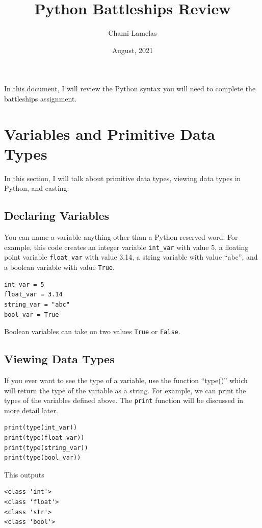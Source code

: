 \documentclass{article}
\title{Python Battleships Review
}
\author{Chami Lamelas}
\date{August, 2021}
\begin{document}
\maketitle
\noindent In this document, I will review the Python syntax you will need to complete the battleships assignment. 

\section{Variables and Primitive Data Types}
In this section, I will talk about primitive data types, viewing data types in Python, and casting.

\subsection{Declaring Variables}
You can name a variable anything other than a Python reserved word. For example, this code creates an integer variable \texttt{int\_var} with value 5, a floating point variable \texttt{float\_var} with value 3.14, a string variable with value ``abc'', and a boolean variable with value \texttt{True}.
\begin{verbatim}
int_var = 5
float_var = 3.14
string_var = "abc"
bool_var = True
\end{verbatim}
Boolean variables can take on two values \texttt{True} or \texttt{\texttt{False}}.

\subsection{Viewing Data Types}
If you ever want to see the type of a variable, use the function ``type()'' which will return the type of the variable as a string. For example, we can print the types of the variables defined above. The \texttt{print} function will be discussed in more detail later.
\begin{verbatim}
print(type(int_var))
print(type(float_var))
print(type(string_var))
print(type(bool_var))
\end{verbatim}
This outputs
\begin{verbatim}
<class 'int'>
<class 'float'>
<class 'str'>
<class 'bool'>
\end{verbatim}
\end{document}

